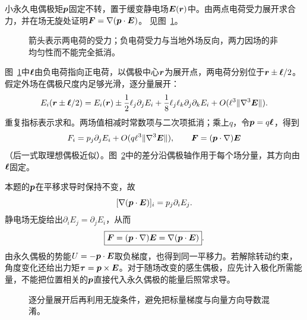\begin{exercise}[偏心电场中的偶极子受力]\label{ex:c3-h12}
小永久电偶极矩$\bm{p}$固定不转，置于缓变静电场$\bm{E}(\bm{r})$中。由两点电荷受力展开求合力，并在场无旋处证明$\bm{F}=\nabla(\bm{p}\cdot\bm{E})$。 见图~\ref{fig:c3-h12-q}。
\end{exercise}

\begin{figure}[H]\centering
{}
\caption{箭头表示两电荷的受力；负电荷受力与当地外场反向，两力因场的非均匀性而不能完全抵消。}\label{fig:c3-h12-q}
\end{figure}
\begin{solution}
图~\ref{fig:c3-h12-q}中$\bm{\ell}$由负电荷指向正电荷，以偶极中心$\bm{r}$为展开点，两电荷分别位于$\bm{r}\pm\bm{\ell}/2$。假定外场在偶极尺度内足够光滑，逐分量展开：
\[E_i(\bm{r}\pm\bm{\ell}/2)=E_i(\bm{r})
\pm\frac12\ell_j\partial_jE_i
+\frac18\ell_j\ell_k\partial_j\partial_kE_i+O(\ell^3\|\nabla^3\bm{E}\|).
\]
重复指标表示求和。两场值相减时常数项与二次项抵消；乘上$q$，令$\bm{p}=q\bm{\ell}$，得到
\[F_i=p_j\partial_jE_i+O(q\ell^3\|\nabla^3\bm{E}\|),\qquad
\bm{F}=(\bm{p}\cdot\nabla)\bm{E}
\]
（后一式取理想偶极近似）。图~\ref{fig:c3-h12-s}中的差分沿偶极轴作用于每个场分量，其方向由$\bm{\ell}$固定。

本题的$\bm{p}$在平移求导时保持不变，故
\[[\nabla(\bm{p}\cdot\bm{E})]_i=p_j\partial_iE_j.
\]
静电场无旋给出$\partial_iE_j=\partial_jE_i$，从而
\[\boxed{\bm{F}=(\bm{p}\cdot\nabla)\bm{E}
=\nabla(\bm{p}\cdot\bm{E})}.\]
由永久偶极的势能$U=-\bm{p}\cdot\bm{E}$取负梯度，也得到同一平移力。若解除转动约束，角度变化还给出力矩$\bm{\tau}=\bm{p}\times\bm{E}$。对于随场改变的感生偶极，应先计入极化所需能量，不能把位置相关的$\bm{p}$直接代入永久偶极的能量后照常求导。

\begin{figure}[H]\centering
{}
\caption{逐分量展开后再利用无旋条件，避免把标量梯度与向量方向导数混淆。}\label{fig:c3-h12-s}
\end{figure}
\end{solution}

